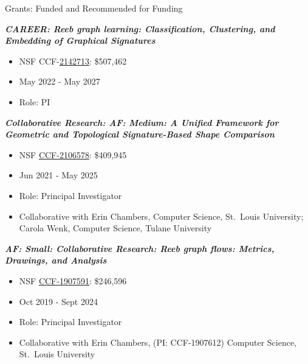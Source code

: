 \documentclass{resume} %
\begin{document}
\newpage
\begin{rSection}{Grants: Funded and Recommended for Funding}

\textbf{\textit{CAREER: Reeb graph learning: Classification, Clustering, and Embedding of Graphical Signatures
}}
\vspace{-.1in}
\begin{itemize}{}{\leftmargin=0em}
   \itemsep -0.6em %
   \item NSF CCF-\href{https://nsf.gov/awardsearch/showAward?AWD_ID=2142713}{2142713}:  \$507,462
\item
May 2022 - May 2027
   \item
Role: PI

\end{itemize}



\textbf{\textit{Collaborative Research: AF: Medium: A Unified Framework for Geometric and Topological Signature-Based Shape Comparison}}
\vspace{-.1in}
\begin{itemize}{}{\leftmargin=0em}
   \itemsep -0.6em %
   \item
NSF \href{https://nsf.gov/awardsearch/showAward?AWD_ID=2106578}{CCF-2106578}:  \$409,945
\item
Jun 2021 - May 2025
   \item
Role: Principal Investigator
\item Collaborative with
  Erin Chambers, Computer Science, St.~Louis University; Carola Wenk, Computer Science, Tulane University

\end{itemize}

\textbf{\textit{AF: Small: Collaborative Research: Reeb graph flows: Metrics, Drawings, and Analysis}}
\vspace{-.1in}
\begin{itemize}{}{\leftmargin=0em}
   \itemsep -0.6em %
   \item
NSF \href{https://nsf.gov/awardsearch/showAward?AWD_ID=1907591}{CCF-1907591}:  \$246,596
\item
Oct 2019 - Sept 2024
   \item
Role: Principal Investigator
\item Collaborative with
  Erin Chambers, (PI: CCF-1907612) Computer Science, St.~Louis University


\end{itemize}
\end{rSection}
\end{document}
